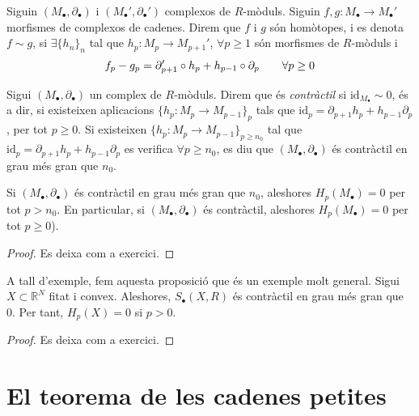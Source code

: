 \documentclass[../main.tex]{subfiles}
\begin{document}
\begin{defi}
 Siguin $(M_\bullet,\partial_\bullet)$ i $(M_\bullet',\partial_\bullet')$ complexos de $R$-mòduls. Siguin $f,g:M_\bullet\rightarrow M_\bullet'$ morfismes de complexos de cadenes. Direm que $f$ i $g$ són homòtopes, i es denota $f\sim g$, si $\exists\{h_n\}_n$ tal que $h_p:M_p\rightarrow M_{p+1}'$, $\forall p\geq 1$ són morfismes de $R$-mòduls i
\begin{equation}
    \notag
    f_p-g_p = \partial_{p+1}'\circ h_p+h_{p-1}\circ\partial_p\qquad \forall p\geq 0
\end{equation}
\end{defi}


\begin{defi}
Sigui $(M_\bullet,\partial_\bullet)$ un complex de $R$-mòduls. Direm que és \textit{contràctil} si $\mathrm{id}_{M_\bullet}\sim 0$, és a dir, si existeixen aplicacions $\{h_p:M_p\rightarrow M_{p-1}\}_p$ tals que $\mathrm{id}_p = \partial_{p+1}h_p + h_{p-1}\partial_p$, per tot $p\geq 0$. Si existeixen $\{h_p:M_p\rightarrow M_{p-1}\}_{p\geq n_0}$ tal que $\mathrm{id}_p = \partial_{p+1}h_p+h_{p-1}\partial_p$ es verifica $\forall p\geq n_0$, es diu que $(M_\bullet,\partial_\bullet)$ és contràctil en grau més gran que $n_0$.
\end{defi}

\begin{lema}
Si $(M_\bullet,\partial_\bullet)$ és contràctil en grau més gran que $n_0$, aleshores $H_p(M_\bullet) = 0$ per tot $p>n_0$. En particular, si $(M_\bullet,\partial_\bullet)$ és contràctil, aleshores $H_p(M_\bullet) = 0$ per tot $p\geq 0$).
\end{lema}
\begin{proof}
Es deixa com a exercici.
\end{proof}

\begin{prop}
A tall d'exemple, fem aquesta proposició que és un exemple molt general. Sigui $X\subset\mathbb{R}^N$ fitat i convex. Aleshores, $S_\bullet(X,R)$ és contràctil en grau més gran que 0. Per tant, $H_p(X) = 0$ si $p>0$.
\end{prop}
\begin{proof}
Es deixa com a exercici.
\end{proof}



\section{El teorema de les cadenes petites}
\end{document}
